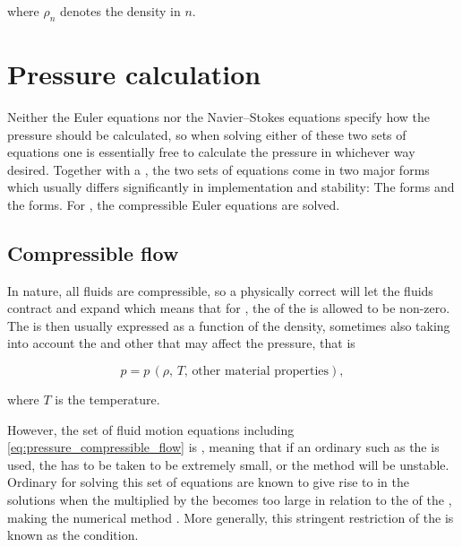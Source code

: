 where $\rho_n$ denotes the density in \timestep $n$.

\section{Pressure calculation}
\label{sec:pressure_calculation}

Neither the Euler equations nor the Navier--Stokes equations specify how the pressure should be calculated, so when solving either of these two sets of equations one is essentially free to calculate the pressure in whichever way desired. Together with a , the two sets of equations come in two major forms which usually differs significantly in implementation and stability: The \compressible forms and the \incompressible forms. For \thisprojectwork, the compressible Euler equations are solved.

\subsection{Compressible flow}

In nature, all fluids are compressible, so a physically correct  will let the fluids contract and expand which means that for , the \divergence of the  is allowed to be non-zero. The \pressure is then usually expressed as a function of the density, sometimes also taking into account the \temperature and other \properties that may affect the pressure, that is

\begin{equation} \label{eq:pressure_compressible_flow}
p = p\,(\rho,\,T,\,\text{other material properties}),
\end{equation}

where $T$ is the temperature.

However, the set of fluid motion equations including \eqref{eq:pressure_compressible_flow} is , meaning that if an ordinary  such as the  is used, the \timestep has to be taken to be extremely small, or the method will be unstable. Ordinary  for solving this set of equations are known to give rise to  in the solutions when the  multiplied by the  becomes too large in relation to the  of the \cells, making the numerical method \unstable. More generally, this stringent restriction of the \timestep is known as the \CFL condition.

